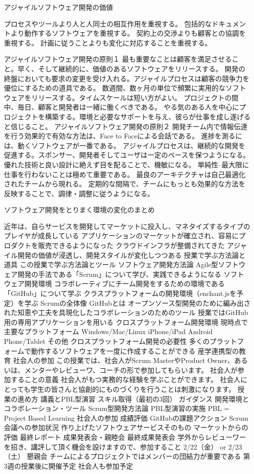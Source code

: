 \documentclass[11pt,a4paper,twoside]{jarticle}
\newcommand{\研究種別}{A}	%
\newcommand{\研究課題名}{コ・クリエイティブなソフトウェア開発のPBL型教育}
\newcommand{\研究機関名}{産業技術大学院大学}
\newcommand{\研究代表者氏名}{中鉢　欣秀}
\newcommand{\研究代表者氏名ふりがな}{ちゅうばち　よしひで}
\newcommand{\本応募effort}{\KLEffort{18}}	%
\newcommand{\研究期間の最終元号年度}{27}	%
\begin{document}
{アジャイルソフトウェア開発の価値

プロセスやツールより人と人同士の相互作用を重視する。
包括的なドキュメントより動作するソフトウェアを重視する。
契約上の交渉よりも顧客との協調を重視する。
計画に従うことよりも変化に対応することを重視する。


アジャイルソフトウェア開発の原則１
最も重要なことは顧客を満足させること。早く、そして継続的に、価値のあるソフトウェアをリリースする。
開発の終盤においても要求の変更を受け入れる。アジャイルプロセスは顧客の競争力を優位にするための道具である。
数週間、数ヶ月の単位で頻繁に実用的なソフトウェアをリリースする。タイムスケールは短い方がよい。
プロジェクトの間中、毎日、顧客と開発者は一緒に働くべきである。
やる気のある人を中心にプロジェクトを構築する。環境と必要なサポートを与え、彼らが仕事を成し遂げると信じること。
アジャイルソフトウェア開発の原則２
開発チーム内で情報伝達を行う効果的で有効な方法は、Face to Faceによる会話である。
進捗を測るには、動くソフトウェアが一番である。
アジャイルプロセスは、継続的な開発を促進する。スポンサー、開発者そしてユーザは一定のペースを保つようになる。
優れた技術と良い設計に絶えず目を配ることで、機敏になる。
単純性--最大限に仕事を行わないことは極めて重要である。
最良のアーキテクチャは自己最適化されたチームから現れる。
定期的な間隔で、チームにもっとも効果的な方法を反映することで、調律・調整に従うようになる。

ソフトウェア開発をとりまく環境の変化のまとめ

近年は、自らサービスを開発してマーケットに投入し、マネタイズするタイプのプレイヤが成長している
アプリケーションのマーケットが確立され、容易にプロダクトを販売できるようになった
クラウドインフラが整備されてきた
アジャイル開発の価値が浸透し、開発スタイルが変化しつつある
授業で学ぶ方法論と道具
この授業で学ぶ方法論とツール
ソフトウェア開発方法論
Agile型ソフトウェア開発の手法である「Scrum」について学び、実践できるようになる
ソフトウェア開発環境
コラボレーティブにチーム開発をするための環境である「GitHub」について学ぶ
クラスプラットフォームの開発環境（enchant.jsを予定）を学ぶ
Scrumの全体像
GitHubとは
オープンソース型開発のために編み出された知恵や工夫を具現化したコラボレーションのためのツール
授業ではGitHub用の専用アプリケーションを用いる
クロスプラットフォーム開発環境
現時点で主要なプラットフォーム
Windows/Mac/Linux
iPhone/iPad
Android Phone/Tablet
その他
クロスプラットフォーム開発の必要性
多くのプラットフォームで動作するソフトウェアを一度に作成することができる
産学連携型の教育
社会人の参加
この授業では、社会人がScrum MasterやProduct Owner、あるいは、メンターやレビューワ、コーチの形で参加してもらいます。
社会人が参加することの意義
社会人がもつ実務的な経験を学ぶことができます。
社会人にとっても学生の皆さんと協創的にものづくりを行うことは刺激になります。
授業の進め方
講義とPBL型演習
スキル取得（最初の3回）
ガイダンス
開発環境とコラボレーション・ツール
Scrum型開発方法論
PBL型演習の実施
PBL = Project Based Learning
社会人の参加
成績評価
GitHubの課題アクション
Scrum会議への参加状況
作り上げたソフトウェアサービスそのもの
マーケットからの評価
最終レポート
成果発表会・親睦会
最終成果発表会
学外からレビューワーを招き、講評して頂く機会を設けますので、参加すること
2/22（金） or 2/23（土）
懇親会
チームによるプロジェクトではメンバーの団結力が重要である
第3週の授業後に開催予定
社会人も参加予定


}
\end{document}
